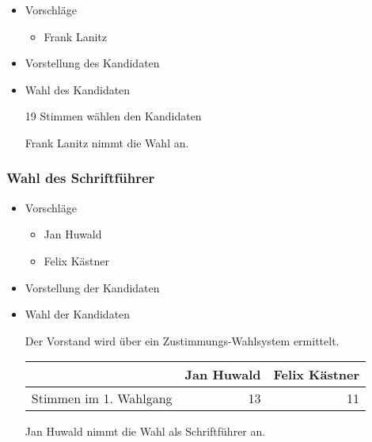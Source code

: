 \documentclass[11pt]{article}
\begin{document}
\begin{itemize}

\item Vorschläge\\
\label{sec-1.7.2.1}

\begin{itemize}
\item Frank Lanitz
\end{itemize}

\item Vorstellung des Kandidaten\\
\label{sec-1.7.2.2}


\item Wahl des Kandidaten\\
\label{sec-1.7.2.3}

19 Stimmen wählen den Kandidaten

Frank Lanitz nimmt die Wahl an.
\end{itemize} %
\subsubsection{Wahl des Schriftführer}
\label{sec-1.7.3}

\begin{itemize}

\item Vorschläge\\
\label{sec-1.7.3.1}

\begin{itemize}
\item Jan Huwald
\item Felix Kästner
\end{itemize}

\item Vorstellung der Kandidaten\\
\label{sec-1.7.3.2}


\item Wahl der Kandidaten\\
\label{sec-1.7.3.3}



Der Vorstand wird über ein Zustimmungs-Wahlsystem ermittelt.


\begin{center}
\begin{tabular}{lrr}
\hline
                         &  Jan Huwald  &  Felix Kästner  \\
\hline
 Stimmen im 1. Wahlgang  &          13  &             11  \\
\hline
\end{tabular}
\end{center}



Jan Huwald nimmt die Wahl als Schriftführer an.

\end{itemize} %
\end{document}
